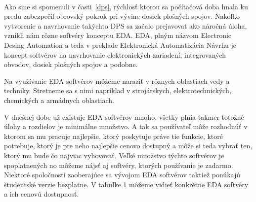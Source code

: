 \documentclass[12pt,slovak,a4paper, twocolumn]{article}
\begin{document}
\paragraph{} Ako sme si spomenuli v časti~\ref{dps}, rýchlosť ktorou sa počítačová doba hnala ku predu zabezpečil obrovský pokrok pri vývine dosiek plošných spojov. Nakoľko vytvorenie a navrhovanie takýchto DPS sa začalo prejavovať ako náročná úloha, vznikli nám rôzne softvéry konceptu EDA. EDA, plným názvom Electronic Desing Automation a teda v preklade Elektronická Automatizácia Návrhu je koncept softvérov na navrhovanie elektronických zariadení, integrovaných obvodov, dosiek plošných spojov a podobne\cite{EDA}. \newline 
\par Na využívanie EDA softvérov môžeme naraziť v rôznych oblastiach vedy a techniky. Stretneme sa s nimi napríklad v strojárskych, elektrotechnických, chemických a armádnych oblastiach\cite{EDA}. \newline 
\par V dnešnej dobe už existuje EDA softvérov mnoho, všetky plnia takmer totožné úlohy a rozdielov je minimálne množstvo. A tak sa používateľ môže rozhodnúť v ktorom sa mu pracuje najlepšie, ktorý poskytuje práve tie funkcie, ktoré potrebuje, ktorý je pre neho najlepšie cenovo dostupný a môže si teda vybrať ten, ktorý mu bude čo najviac vyhovovať. Veľké množstvo týchto softvérov je spoplatnených no môžeme nájsť aj softvéry, ktorých používanie je zadarmo. Niektoré spoločnosti zaoberajúce sa vývojom EDA softvérov taktiež ponúkajú študentské verzie bezplatne. V tabuľke 1 môžeme vidieť konkrétne EDA softvéry a ich cenovú dostupnosť. 

\begin{table}[!ht]
    \caption{Ceny EDA softvérov pre študentov.}
\end{table}
\end{document}

